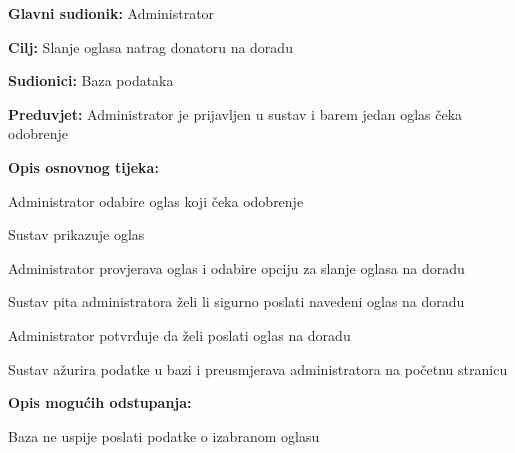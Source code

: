 					\noindent {}
					\begin{packed_item}
	
						\item \textbf{Glavni sudionik: }Administrator
						\item  \textbf{Cilj:} Slanje oglasa natrag donatoru na doradu
						\item  \textbf{Sudionici:} Baza podataka
						\item  \textbf{Preduvjet:} Administrator je prijavljen u sustav i barem jedan oglas čeka odobrenje
						\item  \textbf{Opis osnovnog tijeka:}
						
						\item[] \begin{packed_enum}
							\item Administrator odabire oglas koji čeka odobrenje
							\item Sustav prikazuje oglas
							\item Administrator provjerava oglas i odabire opciju za slanje oglasa na doradu
							\item Sustav pita administratora želi li sigurno poslati navedeni oglas na doradu
							\item Administrator potvrđuje da želi poslati oglas na doradu
							\item Sustav ažurira podatke u bazi i preusmjerava administratora na početnu stranicu
						\end{packed_enum}

						\eject

						\item  \textbf{Opis mogućih odstupanja:}

						\item[] \begin{packed_item}
							\item[2.a] Baza ne uspije poslati podatke o izabranom oglasu
							\item[] \begin{packed_enum}
								

\end{packed_enum}
\end{packed_item}
\end{packed_item}

